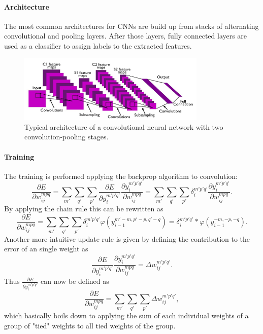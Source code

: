 \paragraph{Architecture}

The most common architectures for CNNs are build up from stacks of alternating convolutional and pooling layers. 
After those layers, fully connected layers are used as a classifier to assign
labels to the extracted features.

\begin{figure}
	\centering
    	\includegraphics[width=0.8\textwidth]{imgs/cnn_architecture.jpg} 
    \caption{Typical architecture of a convolutional neural network with two convolution-pooling stages.}
	\label{fig:convarcitecuture}
\end{figure}

\paragraph{Training}

The training is performed applying the backprop algorithm to convolution:
\[
\frac{\partial E}{\partial w_{ij}^{mpq}} = \sum_{m'} \sum_ {q'}  \sum_{p'} \frac{\partial E}{\partial y_i^{m' p' q'}}  \frac{\partial y_i^{m' p' q'}}{\partial w_{ij}^{mpq}}  = \sum_{m'} \sum_ {q'}  \sum_{p'} \delta_i^{m' p' q'}  \frac{\partial y_i^{m' p' q'}}{\partial w_{ij}^{mpq}}.
\] 
By applying the chain rule this can be rewritten as
\[
\frac{\partial E}{\partial w_{ij}^{mpq}} = \sum_{m'} \sum_ {q'}  \sum_{p'} \delta_i^{m' p' q'}  \varphi(y_{i-1}^{m'-m, p'-p, q'-q}) = \delta_i^{m' p' q'}  * \varphi(y_{i-1}^{-m, -p, -q}).
\] 
Another more intuitive update rule is given by defining the contribution to the error of an single weight as
\[
\frac{\partial E}{\partial y_i^{m' p' q'}}  \frac{\partial y_i^{m' p' q'}}{\partial w_{ij}^{mpq}}  = \Delta w_{ij}^{m' p' q'}.
\] 
Thus $\frac{\partial E}{\partial y_i^{m' p' q'}}$ can now be defined as
\[
\frac{\partial E}{\partial w_{ij}^{mpq}} = \sum_{m'} \sum_ {q'}  \sum_{p'} \Delta w_{ij}^{m' p' q'},
\] 
which basically boils down to applying the sum of each individual weights of a group of "tied" weights to all tied weights of the group.

